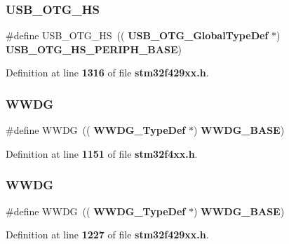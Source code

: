 \subsubsection{U\+S\+B\+\_\+\+O\+T\+G\+\_\+\+HS}
{\footnotesize\ttfamily \#define U\+S\+B\+\_\+\+O\+T\+G\+\_\+\+HS~((\textbf{ U\+S\+B\+\_\+\+O\+T\+G\+\_\+\+Global\+Type\+Def} $\ast$) \textbf{ U\+S\+B\+\_\+\+O\+T\+G\+\_\+\+H\+S\+\_\+\+P\+E\+R\+I\+P\+H\+\_\+\+B\+A\+SE})}



Definition at line \textbf{ 1316} of file \textbf{ stm32f429xx.\+h}.

\mbox{\label{group__Peripheral__declaration_ga9821fd01757986612ddb8982e2fe27f1}} 
\subsubsection{W\+W\+DG\hspace{0.1cm}{\footnotesize\ttfamily [1/2]}}
{\footnotesize\ttfamily \#define W\+W\+DG~((\textbf{ W\+W\+D\+G\+\_\+\+Type\+Def} $\ast$) \textbf{ W\+W\+D\+G\+\_\+\+B\+A\+SE})}



Definition at line \textbf{ 1151} of file \textbf{ stm32f4xx.\+h}.

\mbox{\label{group__Peripheral__declaration_ga9821fd01757986612ddb8982e2fe27f1}} 
\subsubsection{W\+W\+DG\hspace{0.1cm}{\footnotesize\ttfamily [2/2]}}
{\footnotesize\ttfamily \#define W\+W\+DG~((\textbf{ W\+W\+D\+G\+\_\+\+Type\+Def} $\ast$) \textbf{ W\+W\+D\+G\+\_\+\+B\+A\+SE})}



Definition at line \textbf{ 1227} of file \textbf{ stm32f429xx.\+h}.

